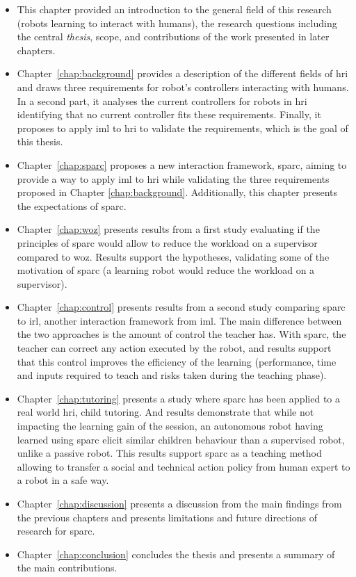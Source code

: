 \begin{itemize}
	\item This chapter provided an introduction to the general field of this research (robots learning to interact with humans), the research questions including the central \textit{thesis}, scope, and contributions of the work presented in later chapters.  

	\item Chapter~\ref{chap:background} provides a description of the different fields of \gls{hri} and draws three requirements for robot's controllers interacting with humans. In a second part, it analyses the current controllers for robots in \gls{hri} identifying that no current controller fits these requirements. Finally, it proposes to apply \gls{iml} to \gls{hri} to validate the requirements, which is the goal of this thesis.
	
	\item Chapter~\ref{chap:sparc} proposes a new interaction framework, \gls{sparc}, aiming to provide a way to apply \gls{iml} to \gls{hri} while validating the three requirements proposed in Chapter \ref{chap:background}. Additionally, this chapter presents the expectations of \gls{sparc}.
	
	\item Chapter~\ref{chap:woz} presents results from a first study evaluating if the principles of \gls{sparc} would allow to reduce the workload on a supervisor compared to \gls{woz}. Results support the hypotheses, validating some of the motivation of \gls{sparc} (a learning robot would reduce the workload on a supervisor).
	
	\item Chapter~\ref{chap:control} presents results from a second study comparing \gls{sparc} to \gls{irl}, another interaction framework from \gls{iml}. The main difference between the two approaches is the amount of control the teacher has. With \gls{sparc}, the teacher can correct any action executed by the robot, and results support that this control improves the efficiency of the learning (performance, time and inputs required to teach and risks taken during the teaching phase).
	
	\item Chapter~\ref{chap:tutoring} presents a study where \gls{sparc} has been applied to a real world \gls{hri}, child tutoring. And results demonstrate that while not impacting the learning gain of the session, an autonomous robot having learned using \gls{sparc} elicit similar children behaviour than a supervised robot, unlike a passive robot. This results support \gls{sparc} as a teaching method allowing to transfer a social and technical action policy from human expert to a robot in a safe way.
	
	\item Chapter~\ref{chap:discussion} presents a discussion from the main findings from the previous chapters and presents limitations and future directions of research for \gls{sparc}.
	
	\item Chapter~\ref{chap:conclusion} concludes the thesis and presents a summary of the main contributions.
	
\end{itemize}
